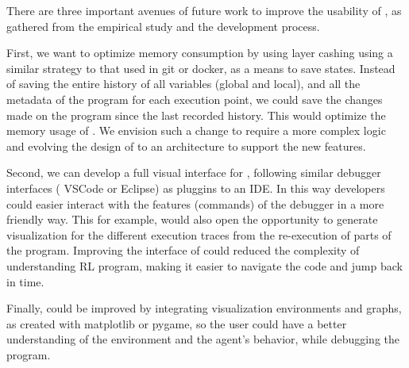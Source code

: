 There are three important avenues of future work to improve the usability of \flik, as gathered from the 
empirical study and the development process. 

First, we want to optimize memory consumption by using layer cashing using a similar strategy to that 
used in git or docker, as a means to save states. Instead of saving the entire history of all variables 
(global and local), and all the metadata of the program for each execution point, we could 
save the changes made on the program since the last recorded history. This would optimize the 
memory usage of \flik. We envision such a change to require a more complex logic and evolving the 
design of \flik to an architecture to support the new features. 

Second, we can develop a full visual interface for \flik, following similar debugger interfaces (\eg 
VSCode or Eclipse) as pluggins to an IDE. In this way developers could easier interact with the features 
(commands) of the debugger in a more friendly way. This for example, would also open the opportunity 
to generate visualization for the different execution traces from the re-execution of parts of the program.
Improving the interface of \flik could reduced the complexity of understanding \ac{RL} program,
making it easier to navigate the code and jump back in time.

Finally, \flik could be improved by integrating visualization environments and graphs, as created with 
matplotlib or pygame, so the user could have a better understanding of the environment and the 
agent's behavior, while debugging the program.


\endinput
